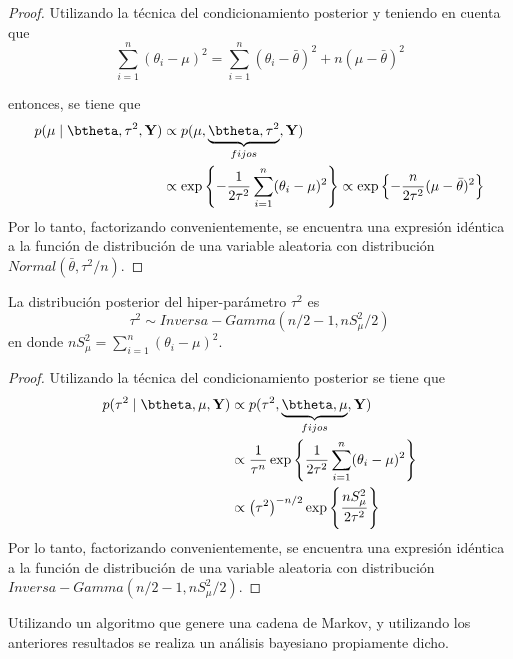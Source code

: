 \documentclass[10pt,openright]{book}\usepackage[]{graphicx}\usepackage[]{color}
\begin{document}
\begin{proof}
Utilizando la t\'ecnica del condicionamiento posterior y teniendo en cuenta que
\begin{equation*}
\sum_{i=1}^n(\theta_i-\mu)^2=\sum_{i=1}^n(\theta_i-\bar{\theta})^2+n(\mu-\bar{\theta})^2
\end{equation*}

entonces, se tiene que
\begin{align*}
p(\mu \mid \btheta,\tau^2,\mathbf{Y})
&\propto p(\mu,\underbrace{\btheta,\tau^2}_{fijos},\mathbf{Y})\\
&\propto \exp\left\{-\frac{1}{2\tau^2}\sum_{i=1}^n(\theta_i-\mu)^2\right\}
 \propto \exp\left\{-\frac{n}{2\tau^2}(\mu-\bar{\theta})^2\right\}
\end{align*}
Por lo tanto, factorizando convenientemente, se encuentra una expresi\'on id\'entica a la funci\'on de distribuci\'on de una variable aleatoria con distribuci\'on $Normal(\bar{\theta},\tau^2/n)$.
\end{proof}

\begin{Res}
La distribuci\'on posterior del hiper-par\'ametro $\tau^2$ es
\begin{equation*}
\tau^2 \sim Inversa-Gamma(n/2-1,nS^2_{\mu}/2)
\end{equation*}
en donde $nS^2_{\mu}=\sum_{i=1}^n(\theta_i-\mu)^2$.
\end{Res}

\begin{proof}
Utilizando la t\'ecnica del condicionamiento posterior se tiene que
\begin{align*}
p(\tau^2 \mid \btheta,\mu,\mathbf{Y})
&\propto p(\tau^2,\underbrace{\btheta,\mu}_{fijos},\mathbf{Y})\\
&\propto \frac{1}{\tau^n} \exp\left\{\frac{1}{2\tau^2}\sum_{i=1}^n(\theta_i-\mu)^2\right\}\\
&\propto \left(\tau^2\right)^{-n/2} \exp\left\{\frac{nS^2_{\mu}}{2\tau^2}\right\}
\end{align*}
Por lo tanto, factorizando convenientemente, se encuentra una expresi\'on id\'entica a la funci\'on de distribuci\'on de una variable aleatoria con distribuci\'on $Inversa-Gamma(n/2-1,nS^2_{\mu}/2)$.
\end{proof}

Utilizando un algoritmo que genere una cadena de Markov, y utilizando los anteriores resultados se realiza un an\'alisis bayesiano propiamente dicho.
\end{document}
